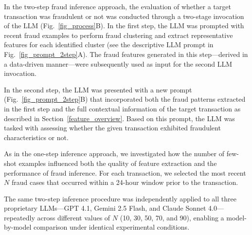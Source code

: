 \documentclass[sigconf]{acmart}
\begin{document}
In the two-step fraud inference approach, the evaluation of whether a target transaction was fraudulent or not  was conducted through a two-stage invocation of the LLM (Fig.~\ref{fig_process}B).
In the first step, the LLM was prompted with recent fraud examples to perform fraud clustering and extract representative features for each identified cluster (see the descriptive LLM prompt in Fig.~\ref{fig_prompt_2step}A). The fraud features generated in this step—derived in a data-driven manner—were subsequently used as input for the second LLM invocation.

In the second step, the LLM was presented with a new prompt (Fig.~\ref{fig_prompt_2step}B) that incorporated both the fraud patterns extracted in the first step and the full contextual information of the target transaction as described in Section~\ref{feature_overview}. Based on this prompt, the LLM was tasked with assessing whether the given transaction exhibited fraudulent characteristics or not.

As in the one-step inference approach, we investigated how the number of few-shot examples influenced both the quality of feature extraction and the performance of fraud inference. For each transaction, we selected the most recent $N$ fraud cases that occurred within a 24-hour window prior to the transaction. 

The same two-step inference procedure was independently applied to all three proprietary LLMs—GPT 4.1, Gemini 2.5 Flash, and Claude Sonnet 4.0—repeatedly across different values of $N$ (10, 30, 50, 70, and 90), enabling a model-by-model comparison under identical experimental conditions.
\end{document}
